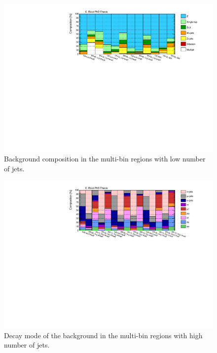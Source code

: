 \begin{figure}[htbp]
\includegraphics[width=\textwidth]{figures/Chap8/Rizzi-Fig8-22.pdf}
\caption{Background composition in the multi-bin regions with low number of jets.}
	\label{fig:bkgcomp_Lnj}
\end{figure}



\begin{figure}[htbp]
\includegraphics[width=\textwidth]{figures/Chap8/Rizzi-Fig8-23.pdf}
\caption{Decay mode of the \ttbar background in the multi-bin regions with high number of jets.}
	\label{fig:ttcomp_Hnj}
\end{figure}


